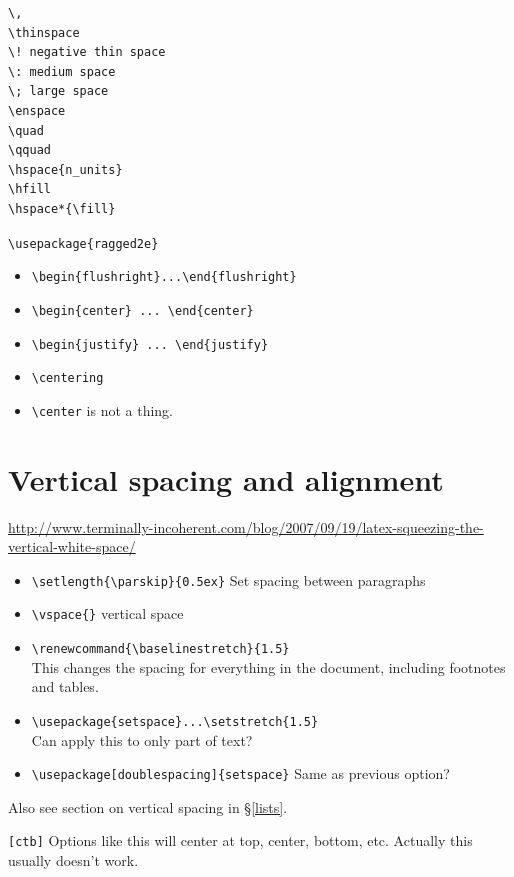 \documentclass{article}
\begin{document}
\begin{verbatim}
\,
\thinspace
\! negative thin space
\: medium space
\; large space
\enspace
\quad
\qquad
\hspace{n_units}
\hfill
\hspace*{\fill}
\end{verbatim}

\verb|\usepackage{ragged2e}|
\begin{itemize}
    \item \verb|\begin{flushright}...\end{flushright}|
    \item \verb|\begin{center} ... \end{center}|
    \item \verb|\begin{justify} ... \end{justify}|
    \item \verb|\centering|
    \item \verb|\center| is not a thing.
\end{itemize}

\section{Vertical spacing and alignment}
\url{http://www.terminally-incoherent.com/blog/2007/09/19/latex-squeezing-the-vertical-white-space/}

\begin{itemize}
    \item \verb|\setlength{\parskip}{0.5ex}| Set spacing between paragraphs
    \item \verb|\vspace{}| vertical space
    \item \verb|\renewcommand{\baselinestretch}{1.5}|\\
        This changes the spacing for everything in the document,
        including footnotes and tables.
    \item \verb|\usepackage{setspace}...\setstretch{1.5}|\\
        Can apply this to only part of text?
    \item \verb|\usepackage[doublespacing]{setspace}|
        Same as previous option?
\end{itemize}
Also see section on vertical spacing in \S\ref{lists}.

\verb|[ctb]| Options like this will center at top, center, bottom, etc.
Actually this usually doesn't work.
\end{document}
